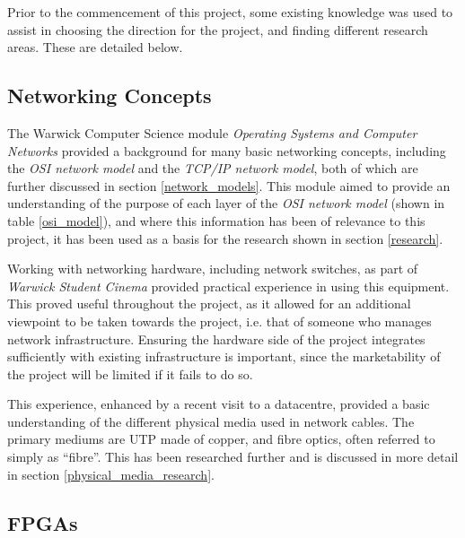 Prior to the commencement of this project, some existing knowledge was used to assist in choosing the direction for the project, and finding different research areas. These are detailed below.

\subsection{Networking Concepts}
\label{networking_concepts_introduction}
The Warwick Computer Science module \textit{Operating Systems and Computer Networks} \cite{cs241} provided a background for many basic networking concepts, including the \textit{OSI network model} and the \textit{TCP/IP network model}, both of which are further discussed in section \ref{network_models}. This module aimed to provide an understanding of the purpose of each layer of the \textit{OSI network model} (shown in table \ref{osi_model}), and where this information has been of relevance to this project, it has been used as a basis for the research shown in section \ref{research}.

Working with networking hardware, including network switches, as part of \textit{Warwick Student Cinema} \cite{wsc} provided practical experience in using this equipment. This proved useful throughout the project, as it allowed for an additional viewpoint to be taken towards the project, i.e. that of someone who manages network infrastructure.
Ensuring the hardware side of the project integrates sufficiently with existing infrastructure is important, since the marketability of the project will be limited if it fails to do so.

This experience, enhanced by a recent visit to a datacentre, provided a basic understanding of the different physical media used in network cables. The primary mediums are UTP made of copper, and fibre optics, often referred to simply as ``fibre''. This has been researched further and is discussed in more detail in section \ref{physical_media_research}.






\subsection{FPGAs}
\label{fpgas}

